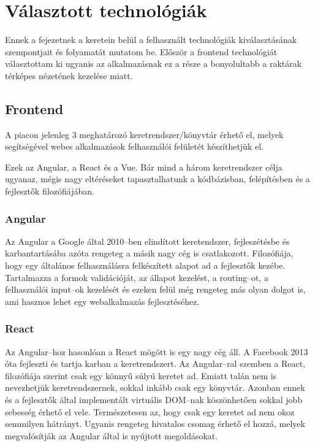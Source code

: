 \chapter{Választott technológiák}

Ennek a fejezetnek a keretein belül a felhasznált technológiák kiválasztásának szempontjait és folyamatát mutatom be. 
Először a frontend technológiát választottam ki ugyanis az alkalmazásnak ez a része a bonyolultabb a raktárak térképes nézetének kezelése miatt.

\section{Frontend}

A piacon jelenleg 3 meghatározó keretrendszer/könyvtár érhető el, melyek segítségével webes alkalmazások felhasználói felületét készíthetjük el.

Ezek az Angular, a React és a Vue. 
Bár mind a három keretrendszer célja ugyanaz, mégis nagy eltéréseket tapasztalhatunk a kódbázisban, felépítésben és a fejlesztők filozófiájában.

\subsection{Angular}

Az Angular a Google által 2010–ben elindított keretendszer, fejleszétésbe és karbantartásába azóta rengeteg  a másik nagy cég is csatlakozott\cite{Angular}.
Filozófiája, hogy egy általános felhasználásra felkészített alapot ad a fejlesztők kezébe.
Tartalmazza a formok validációját, az állapot kezelést, a routing–ot, a felhasználói input–ok kezelését és ezeken felül még rengeteg más olyan dolgot is, ami hasznos lehet egy webalkalmazás fejlesztéséhez.

\subsection{React}

Az Angular–hoz hasonlóan a React mögött is egy nagy cég áll.
A Facebook 2013 óta fejleszti és tartja karban a keretrendszert\cite{React}.
Az Angular–ral szemben a React, filozófiája szerint csak egy könnyű súlyú keretet ad. 
Emiatt talán nem is nevezhetjük keretrendszernek, sokkal inkább csak egy könyvtár. 
Azonban ennek és a fejlesztők által implementált virtuális DOM–nak köszönhetően sokkal jobb sebesség érhető el vele.
Természetesen az, hogy csak egy keretet ad nem okoz semmilyen hátrányt.
Ugyanis rengeteg hivatalos csomag érhető el hozzá, melyek megvalósítják az Angular által is nyújtott megoldásokat.

